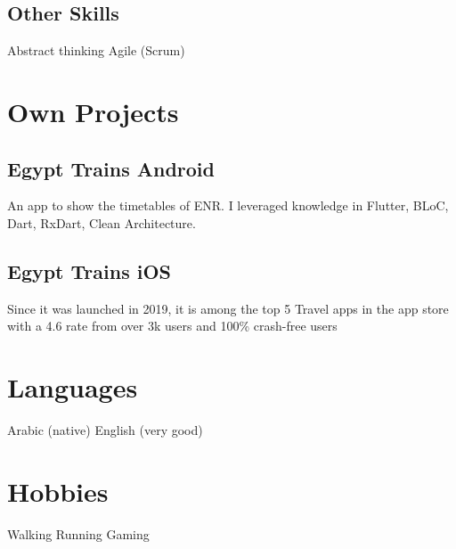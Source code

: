 \documentclass[]{deedy-resume-openfont}
\begin{document}
\begin{minipage}[t]{1\textwidth}
\subsection{Other Skills}
Abstract thinking \textbullet{} Agile (Scrum)
\sectionsep



\section{Own Projects}
\subsection{Egypt Trains Android}
An app to show the timetables of ENR.
I leveraged knowledge in Flutter, BLoC, Dart, RxDart, Clean Architecture.
\sectionsep
\subsection{Egypt Trains iOS}
Since it was launched in 2019, it is among the top 5 Travel apps in the app store with a 4.6 rate from over 3k users and 100\% crash-free users
\sectionsep
\section{Languages}
Arabic (native) \textbullet{} English (very good)
\sectionsep

\section{Hobbies}
Walking \textbullet{} Running \textbullet{} Gaming
\end{minipage} 
\end{document}
